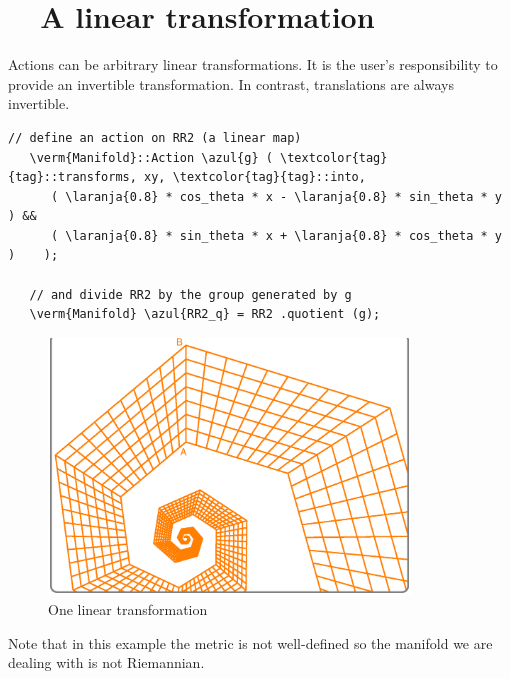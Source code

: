 \section{~~A linear transformation}\label{\numb section 7.\numb parag 17}

Actions can be arbitrary linear transformations.
It is the user's responsibility to provide an invertible transformation.
In contrast, translations are always invertible.

\begin{Verbatim}[commandchars=\\\{\},formatcom=\small\tt,frame=single,
   label=parag-\ref{\numb section 7.\numb parag 17}.cpp,rulecolor=\color{moldura},
   baselinestretch=0.94,framesep=2mm                                             ]
   // define an action on RR2 (a linear map)
   \verm{Manifold}::Action \azul{g} ( \textcolor{tag}{tag}::transforms, xy, \textcolor{tag}{tag}::into,
      ( \laranja{0.8} * cos_theta * x - \laranja{0.8} * sin_theta * y ) &&
      ( \laranja{0.8} * sin_theta * x + \laranja{0.8} * cos_theta * y )    );

   // and divide RR2 by the group generated by g
   \verm{Manifold} \azul{RR2_q} = RR2 .quotient (g);
\end{Verbatim}

\begin{figure}[ht] \centering
  \includegraphics[width=96mm]{sector-2.eps}
  \caption{One linear transformation}
  \label{\numb section 7.\numb fig 13}
\end{figure}

Note that in this example the metric is not well-defined
so the manifold we are dealing with is not Riemannian.


